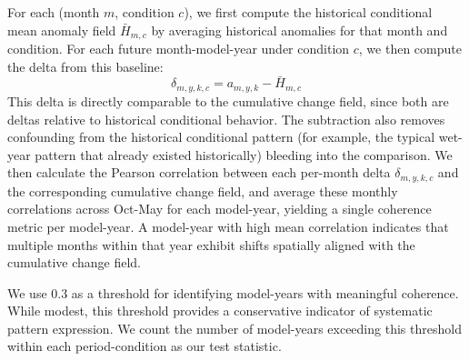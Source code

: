 For each (month $m$, condition $c$), we first compute the historical conditional mean anomaly field $\bar{H}_{m,c}$ by averaging historical anomalies for that month and condition.
%
For each future month-model-year under condition $c$, we then compute the delta from this baseline:
\begin{equation*}
\delta_{m,y,k,c} = a_{m,y,k} - \bar{H}_{m,c}
\end{equation*}
This delta is directly comparable to the cumulative change field, since both are deltas relative to historical conditional behavior.
%
The subtraction also removes confounding from the historical conditional pattern (for example, the typical wet-year pattern that already existed historically) bleeding into the comparison.
%
We then calculate the Pearson correlation between each per-month delta $\delta_{m,y,k,c}$ and the corresponding cumulative change field, and average these monthly correlations across Oct-May for each model-year, yielding a single coherence metric per model-year.
%
A model-year with high mean correlation indicates that multiple months within that year exhibit shifts spatially aligned with the cumulative change field.

We use 0.3 as a threshold for identifying model-years with meaningful coherence.
%
While modest, this threshold provides a conservative indicator of systematic pattern expression.
%
We count the number of model-years exceeding this threshold within each period-condition as our test statistic.


